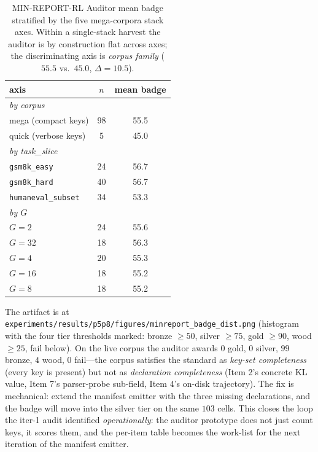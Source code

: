 \begin{table}[t]
\centering
\caption{MIN-REPORT-RL Auditor mean badge stratified by the five
mega-corpora stack axes. Within a single-stack harvest the auditor
is by construction flat across axes; the discriminating axis is
\emph{corpus family} ($55.5$ vs.\ $45.0$, $\Delta = 10.5$).}
\label{tab:p5-auditor-stratified}
\small
\begin{tabular}{@{}lcc@{}}
\toprule
axis & $n$ & mean badge \\
\midrule
\textit{by corpus}    &             & \\
\quad mega (compact keys)        & 98 & 55.5 \\
\quad quick (verbose keys)        &  5 & 45.0 \\
\textit{by task\_slice} &             & \\
\quad \texttt{gsm8k\_easy}        & 24 & 56.7 \\
\quad \texttt{gsm8k\_hard}        & 40 & 56.7 \\
\quad \texttt{humaneval\_subset} & 34 & 53.3 \\
\textit{by $G$}        &             & \\
\quad $G=2$                       & 24 & 55.6 \\
\quad $G=32$                      & 18 & 56.3 \\
\quad $G=4$                       & 20 & 55.3 \\
\quad $G=16$                      & 18 & 55.2 \\
\quad $G=8$                       & 18 & 55.2 \\
\bottomrule
\end{tabular}
\end{table}

The artifact is at
\texttt{experiments/results/p5p8/figures/minreport\_badge\_dist.png}
(histogram with the four tier thresholds marked: bronze $\ge 50$,
silver $\ge 75$, gold $\ge 90$, wood $\ge 25$, fail below). On the
live corpus the auditor awards $0$ gold, $0$ silver, $99$ bronze,
$4$ wood, $0$ fail---the corpus satisfies the standard as
\emph{key-set completeness} (every key is present) but not as
\emph{declaration completeness} (Item 2's concrete KL value, Item 7's
parser-probe sub-field, Item 4's on-disk trajectory). The fix is
mechanical: extend the manifest emitter with the three missing
declarations, and the badge will move into the silver tier on the
same $103$ cells. This closes the loop the iter-1 audit identified
\emph{operationally}: the auditor prototype does not just count keys,
it scores them, and the per-item table becomes the work-list for the
next iteration of the manifest emitter.

